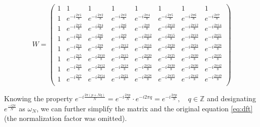 \documentclass[english,11pt,a4paper,table]{article} %
\begin{document}
\begin{equation}
	\label{eq:dft-matrix-example}
	W = \begin{pmatrix}1&1&1&1&1&1&1&1\\
		1&e^{-i \frac{2 \pi1}{8}}&e^{-i \frac{2 \pi2}{8}}&e^{-i \frac{2 \pi3}{8}}&e^{-i \frac{2 \pi4}{8}}&e^{-i \frac{2 \pi5}{8}}&e^{-i \frac{2 \pi6}{8}}&e^{-i \frac{2 \pi7}{8}}\\
		1&e^{-i \frac{2 \pi2}{8}}&e^{-i \frac{2 \pi4}{8}}&e^{-i \frac{2 \pi6}{8}}&e^{-i \frac{2 \pi8}{8}}&e^{-i \frac{2 \pi10}{8}}&e^{-i \frac{2 \pi12}{8}}&e^{-i \frac{2 \pi14}{8}}\\
		1&e^{-i \frac{2 \pi3}{8}}&e^{-i \frac{2 \pi6}{8}}&e^{-i \frac{2 \pi9}{8}}&e^{-i \frac{2 \pi12}{8}}&e^{-i \frac{2 \pi15}{8}}&e^{-i \frac{2 \pi18}{8}}&e^{-i \frac{2 \pi21}{8}}\\
		1&e^{-i \frac{2 \pi4}{8}}&e^{-i \frac{2 \pi8}{8}}&e^{-i \frac{2 \pi12}{8}}&e^{-i \frac{2 \pi16}{8}}&e^{-i \frac{2 \pi20}{8}}&e^{-i \frac{2 \pi24}{8}}&e^{-i \frac{2 \pi28}{8}}\\
		1&e^{-i \frac{2 \pi5}{8}}&e^{-i \frac{2 \pi10}{8}}&e^{-i \frac{2 \pi15}{8}}&e^{-i \frac{2 \pi20}{8}}&e^{-i \frac{2 \pi25}{8}}&e^{-i \frac{2 \pi30}{8}}&e^{-i \frac{2 \pi35}{8}}\\
		1&e^{-i \frac{2 \pi6}{8}}&e^{-i \frac{2 \pi12}{8}}&e^{-i \frac{2 \pi18}{8}}&e^{-i \frac{2 \pi24}{8}}&e^{-i \frac{2 \pi30}{8}}&e^{-i \frac{2 \pi36}{8}}&e^{-i \frac{2 \pi42}{8}}\\
		1&e^{-i \frac{2 \pi7}{8}}&e^{-i \frac{2 \pi14}{8}}&e^{-i \frac{2 \pi21}{8}}&e^{-i \frac{2 \pi28}{8}}&e^{-i \frac{2 \pi35}{8}}&e^{-i \frac{2 \pi42}{8}}&e^{-i \frac{2 \pi49}{8}}\\
		\end{pmatrix}
\end{equation}

Knowing the property $e^{-i \frac{2 \pi (p + N q)}{N}} = e^{-i \frac{2 \pi p}{N}} \cdot e^{-i 2 \pi q} = e^{-i \frac{2 \pi p}{N}},\quad q \in \mathbb{Z}$ and designating $e^{\frac{-i 2 \pi}{N}}$ as $\omega_N$, we can further simplify the matrix and the original equation \ref{eq:dft} (the normalization factor was omitted).
\end{document}

